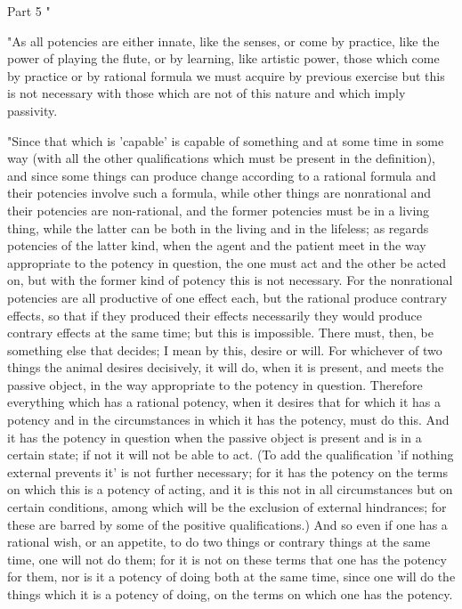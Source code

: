 Part 5 "

"As all potencies are either innate, like the senses, or come by practice,
like the power of playing the flute, or by learning, like artistic
power, those which come by practice or by rational formula we must
acquire by previous exercise but this is not necessary with those
which are not of this nature and which imply passivity. 

"Since that which is 'capable' is capable of something and at some
time in some way (with all the other qualifications which must be
present in the definition), and since some things can produce change
according to a rational formula and their potencies involve such a
formula, while other things are nonrational and their potencies are
non-rational, and the former potencies must be in a living thing,
while the latter can be both in the living and in the lifeless; as
regards potencies of the latter kind, when the agent and the patient
meet in the way appropriate to the potency in question, the one must
act and the other be acted on, but with the former kind of potency
this is not necessary. For the nonrational potencies are all productive
of one effect each, but the rational produce contrary effects, so
that if they produced their effects necessarily they would produce
contrary effects at the same time; but this is impossible. There must,
then, be something else that decides; I mean by this, desire or will.
For whichever of two things the animal desires decisively, it will
do, when it is present, and meets the passive object, in the way appropriate
to the potency in question. Therefore everything which has a rational
potency, when it desires that for which it has a potency and in the
circumstances in which it has the potency, must do this. And it has
the potency in question when the passive object is present and is
in a certain state; if not it will not be able to act. (To add the
qualification 'if nothing external prevents it' is not further necessary;
for it has the potency on the terms on which this is a potency of
acting, and it is this not in all circumstances but on certain conditions,
among which will be the exclusion of external hindrances; for these
are barred by some of the positive qualifications.) And so even if
one has a rational wish, or an appetite, to do two things or contrary
things at the same time, one will not do them; for it is not on these
terms that one has the potency for them, nor is it a potency of doing
both at the same time, since one will do the things which it is a
potency of doing, on the terms on which one has the potency.

